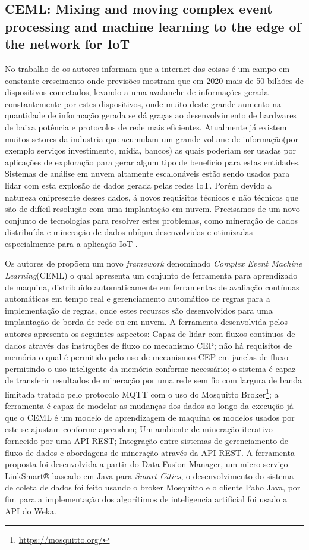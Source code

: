 \documentclass[ti,table]{texufpel} %
\begin{document}
\subsection{CEML: Mixing and moving complex event processing and machine learning to the edge of the network for IoT}

	No trabalho de \cite{art10soto2016ceml} os autores informam que a internet das coisas é um campo em constante crescimento onde previsões mostram que em 2020 mais de 50 bilhões de dispositivos conectados, levando a uma avalanche de informações gerada constantemente por estes dispositivos, onde muito deste grande aumento na quantidade de informação gerada se dá graças ao desenvolvimento de hardwares de baixa potência e protocolos de rede mais eficientes. Atualmente já existem muitos setores da industria que acumulam um grande volume de informação(por exemplo serviços investimento, mídia, bancos) as quais poderiam ser usadas por aplicações de exploração para gerar algum tipo de beneficio para estas entidades. Sistemas de análise em nuvem altamente escalonáveis estão sendo usados para lidar com esta explosão de dados gerada pelas redes IoT. Porém devido a natureza onipresente desses dados, á novos requisitos técnicos e não técnicos que são de difícil resolução com uma implantação em nuvem. Precisamos de um novo conjunto de tecnologias para resolver estes problemas, como mineração de dados distribuída e mineração de dados ubíqua desenvolvidas e otimizadas especialmente para a aplicação IoT .
	
	 Os autores de \cite{art10soto2016ceml} propõem um novo \textit{framework} denominado \textit{Complex Event Machine Learning}(CEML) o qual apresenta um conjunto de ferramenta para aprendizado de maquina, distribuído automaticamente em ferramentas de avaliação contínuas automáticas em tempo real e gerenciamento automático de regras para a implementação de regras, onde estes recursos são desenvolvidos para uma implantação de borda de rede ou em nuvem. A ferramenta desenvolvida pelos autores apresenta os seguintes aspectos: Capaz de lidar com fluxos contínuos de dados através das instruções de fluxo do mecanismo CEP; não há requisitos de memória o qual é permitido pelo uso de mecanismos CEP em janelas de fluxo permitindo o uso inteligente da memória conforme necessário; o sistema é capaz de transferir resultados de mineração por uma rede sem fio com largura de banda limitada tratado pelo protocolo MQTT com o uso do Mosquitto Broker\footnote{\url{https://mosquitto.org/}}; a ferramenta é capaz de modelar as mudanças dos dados ao longo da execução já que o CEML é um modelo de aprendizagem de maquina os modelos usados por este se ajustam conforme aprendem; Um ambiente de mineração iterativo fornecido por uma API REST; Integração entre sistemas de gerenciamento de fluxo de dados e abordagens de mineração através da API REST. A ferramenta proposta foi desenvolvida a partir do Data-Fusion Manager, um micro-serviço LinkSmart® baseado em Java para \textit{Smart Cities}, o desenvolvimento do sistema de coleta de dados foi feito usando o broker Mosquitto e o cliente Paho Java, por fim para a implementação dos algorítimos de inteligencia artificial foi usado a API do Weka. 
	
\end{document}
